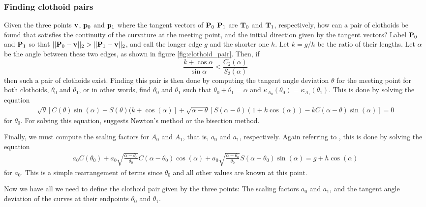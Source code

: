 \subsubsection{Finding clothoid pairs}
Given the three points $\mathbf{v}$, $\mathbf{p}_0$ and $\mathbf{p}_1$ where the tangent vectors of ${\mathbf P}_0$ ${\mathbf P}_1$ are ${\mathbf T}_0$ and ${\mathbf T}_1$, respectively, how can a pair of clothoids be found that satisfies the continuity of the curvature at the meeting point, and the initial direction given by the tangent vectors? Label ${\mathbf P}_0$ and ${\mathbf P}_1$ so that $||{\mathbf P}_0-\mathbf{v}||_2 > ||{\mathbf P}_1-\mathbf{v}||_2$, and call the longer edge $g$ and the shorter one $h$. Let $k=g/h$ be the ratio of their lengths. Let $\alpha$ be the angle between these two edges, as shown in figure \ref{fig:clothoid_pair}. Then, if
\begin{equation}
\frac{k + \cos{\alpha}}{\sin \alpha} < \frac{C_2(\alpha)}{S_2(\alpha)}
\label{eq:clothoid_asymmetry_condition}
\end{equation}
then such a pair of clothoids exist.\cite{clothoid} Finding this pair is then done by computing the tangent angle deviation $\theta$ for the meeting point for both clothoids, $\theta_0$ and $\theta_1$, or in other words, find $\theta_0$ and $\theta_1$ such that $\theta_0 + \theta_1 = \alpha$ and $\kappa_{A_0}(\theta_0) = \kappa_{A_1}(\theta_1)$. This is done by solving the equation 
\begin{align}
\sqrt{\theta}[C(\theta)\sin(\alpha) - S(\theta)(k+\cos(\alpha)] + \sqrt{\alpha-\theta}[S(\alpha-\theta)(1+k\cos(\alpha)) - kC(\alpha - \theta)\sin(\alpha)] = 0
\end{align}
for $\theta_0$. For solving this equation, \cite{clothoid} suggests Newton's method or the bisection method.

Finally, we must compute the scaling factors for $A_0$ and $A_1$, that is, $a_0$ and $a_1$, respectively. Again referring to \cite{clothoid}, this is done by solving the equation
\begin{align}
a_0C(\theta_0)+a_0\sqrt{\frac{\alpha-\theta_0}{\theta_0}}C(\alpha-\theta_0)\cos(\alpha) + a_0\sqrt{\frac{\alpha-\theta_0}{\theta_0}}S(\alpha-\theta_0)\sin(\alpha) = g+h\cos(\alpha)
\end{align}
for $a_0$. This is a simple rearrangement of terms since $\theta_0$ and all other values are known at this point.

Now we have all we need to define the clothoid pair given by the three points: The scaling factors $a_0$ and $a_1$, and the tangent angle deviation of the curves at their endpoints $\theta_0$ and $\theta_1$.

